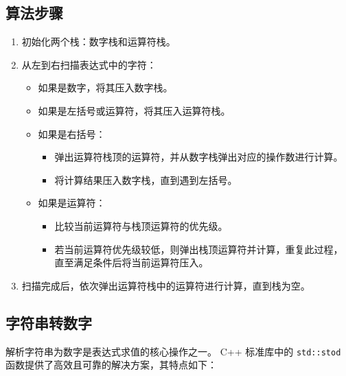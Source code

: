\documentclass[UTF8]{ctexart}
\begin{document}
\subsection{算法步骤}
\begin{enumerate}
    \item 初始化两个栈：数字栈和运算符栈。
    \item 从左到右扫描表达式中的字符：
    \begin{itemize}
        \item 如果是数字，将其压入数字栈。
        \item 如果是左括号或运算符，将其压入运算符栈。
        \item 如果是右括号：
        \begin{itemize}
            \item 弹出运算符栈顶的运算符，并从数字栈弹出对应的操作数进行计算。
            \item 将计算结果压入数字栈，直到遇到左括号。
        \end{itemize}
        \item 如果是运算符：
        \begin{itemize}
            \item 比较当前运算符与栈顶运算符的优先级。
            \item 若当前运算符优先级较低，则弹出栈顶运算符并计算，重复此过程，直至满足条件后将当前运算符压入。
        \end{itemize}
    \end{itemize}
    \item 扫描完成后，依次弹出运算符栈中的运算符进行计算，直到栈为空。
\end{enumerate}
\subsection{字符串转数字}
解析字符串为数字是表达式求值的核心操作之一。
C++ 标准库中的 \texttt{std::stod} 函数提供了高效且可靠的解决方案，其特点如下：

\end{document}
